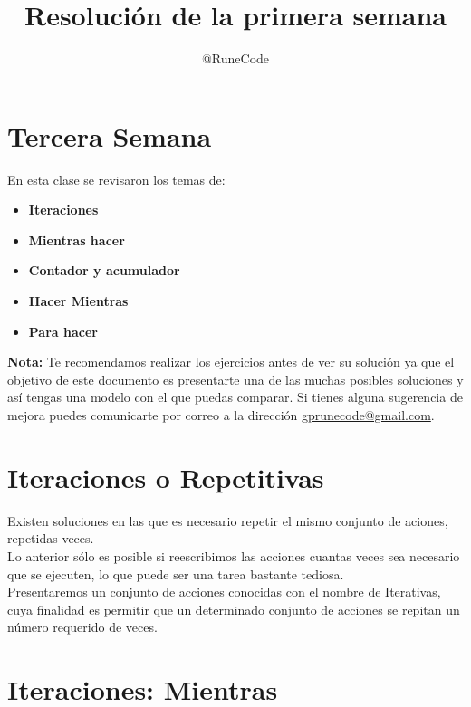 \documentclass{article}
\title{Resolución de la primera semana}
\author{@RuneCode}
\begin{document}



\section*{Tercera Semana}%
En esta clase se revisaron los temas de:
\begin{itemize}
\item \textbf{Iteraciones}
\item \textbf{Mientras hacer}
\item \textbf{Contador y acumulador}
\item \textbf{Hacer Mientras}
\item \textbf{Para hacer}
\end{itemize}
\vspace{1cm}
\textbf{Nota:} Te recomendamos realizar los ejercicios antes de ver su solución
ya que el objetivo de este documento es presentarte una de las muchas posibles
soluciones y así tengas una modelo con el que puedas comparar. Si tienes alguna
sugerencia de mejora puedes comunicarte por correo a la dirección
\href{mailto:gprunecode@gmail.com}{gprunecode@gmail.com}.

\section*{Iteraciones o Repetitivas}%
Existen soluciones en las que es necesario repetir el mismo conjunto de
aciones, repetidas veces.\\
Lo anterior sólo es posible si reescribimos las acciones cuantas veces sea
necesario que se ejecuten, lo que puede ser una tarea bastante tediosa.\\
Presentaremos un conjunto de acciones conocidas con el nombre de Iterativas,
cuya finalidad es permitir que un determinado conjunto de acciones se repitan
un número requerido de veces.

\section{Iteraciones: Mientras}%
\end{document}
